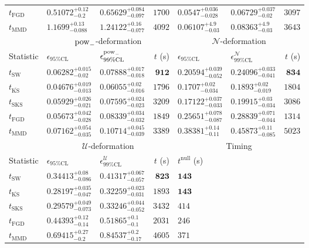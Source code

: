 \begin{tabular}{l|llr|llr}
	$t_{\mathrm{FGD}}$ & ${\mathbf{0.51072_{-0.2}^{+0.12}}}$ & ${\mathbf{0.65629_{-0.097}^{+0.084}}}$ & $1700$ & $0.0547_{-0.028}^{+0.036}$ & ${\mathbf{0.06729_{-0.02}^{+0.037}}}$ & $3097$ \\
	$t_{\mathrm{MMD}}$ & $1.1699_{-0.088}^{+0.13}$ & $1.24122_{-0.077}^{+0.16}$ & $4092$ & $0.06107_{-0.03}^{+4.9}$ & $0.08363_{-0.03}^{+4.9}$ & $3643$ \\
	\toprule
	\multicolumn{1}{c}{} & \multicolumn{3}{c}{$\rm{pow}_{-}$-deformation} & \multicolumn{3}{c}{$\mathcal{N}$-deformation} \\
	Statistic & $\epsilon_{95\%\mathrm{CL}}$ & $\epsilon^  {\rm{pow}_{-}}_{99\%\mathrm{CL}}$ & $t$ (s) & $\epsilon_{95\%\mathrm{CL}}$ & $\epsilon^    {\mathcal{N}}_{99\%\mathrm{CL}}$ & $t$ (s) \\
	\midrule
	$t_{\mathrm{SW}}$ & $0.06282_{-0.02}^{+0.015}$ & $0.07888_{-0.018}^{+0.017}$ & ${\mathbf{912}}$ & $0.20594_{-0.052}^{+0.039}$ & $0.24096_{-0.041}^{+0.033}$ & ${\mathbf{834}}$ \\
	$t_{\overline{\mathrm{KS}}}$ & ${\mathbf{0.04676_{-0.013}^{+0.019}}}$ & ${\mathbf{0.06055_{-0.016}^{+0.02}}}$ & $1796$ & ${\mathbf{0.1707_{-0.034}^{+0.02}}}$ & ${\mathbf{0.1893_{-0.019}^{+0.02}}}$ & $1804$ \\
	$t_{\mathrm{SKS}}$ & $0.05929_{-0.021}^{+0.026}$ & $0.07595_{-0.023}^{+0.024}$ & $3209$ & $0.17122_{-0.033}^{+0.037}$ & $0.19915_{-0.034}^{+0.03}$ & $3086$ \\
	$t_{\mathrm{FGD}}$ & $0.05673_{-0.028}^{+0.042}$ & $0.08339_{-0.032}^{+0.034}$ & $1849$ & $0.25651_{-0.087}^{+0.078}$ & $0.28839_{-0.044}^{+0.071}$ & $1314$ \\
	$t_{\mathrm{MMD}}$ & $0.07162_{-0.035}^{+0.054}$ & $0.10714_{-0.039}^{+0.045}$ & $3389$ & $0.38381_{-0.11}^{+0.14}$ & $0.45873_{-0.085}^{+0.11}$ & $5023$ \\
	\toprule
	\multicolumn{1}{c}{} & \multicolumn{3}{c}{$\mathcal{U}$-deformation} & \multicolumn{3}{c}{Timing} \\
	Statistic & $\epsilon_{95\%\mathrm{CL}}$ & $\epsilon^    {\mathcal{U}}_{99\%\mathrm{CL}}$ & $t$ (s) & $t^{\mathrm{null}}$ (s) \\
	\midrule
	$t_{\mathrm{SW}}$ & $0.34413_{-0.086}^{+0.08}$ & $0.41317_{-0.057}^{+0.067}$ & ${\mathbf{823}}$ & ${\mathbf{143}}$ \\
	$t_{\overline{\mathrm{KS}}}$ & ${\mathbf{0.28197_{-0.047}^{+0.035}}}$ & ${\mathbf{0.32259_{-0.031}^{+0.023}}}$ & $1893$ & ${\mathbf{143}}$ \\
	$t_{\mathrm{SKS}}$ & $0.29579_{-0.073}^{+0.049}$ & $0.33246_{-0.052}^{+0.044}$ & $3432$ & $414$ \\
	$t_{\mathrm{FGD}}$ & $0.44393_{-0.14}^{+0.12}$ & $0.51865_{-0.1}^{+0.1}$ & $2031$ & $246$ \\
	$t_{\mathrm{MMD}}$ & $0.69415_{-0.2}^{+0.27}$ & $0.84537_{-0.17}^{+0.2}$ & $4605$ & $371$ \\
	\bottomrule
\end{tabular}